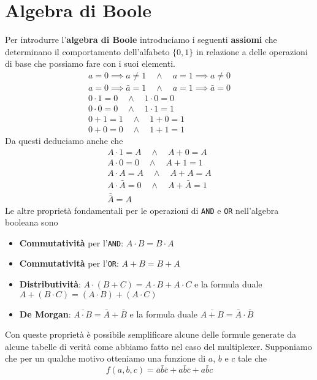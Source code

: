 \section{Algebra di Boole}
Per introdurre l'\textbf{algebra di Boole} introduciamo i seguenti \textbf{assiomi} che determinano
il comportamento dell'alfabeto $\{0, 1\}$ in relazione a delle operazioni di base che possiamo
fare con i suoi elementi.
\begin{gather*}
	a = 0 \implies a \neq 1 \quad \land \quad a = 1 \implies a \neq 0 \\
	a = 0 \implies \bar{a} = 1 \quad \land \quad a = 1 \implies \bar{a} = 0 \\
	0 \cdot 1 = 0 \quad \land \quad 1 \cdot 0 = 0 \\
	0 \cdot 0 = 0 \quad \land \quad 1 \cdot 1 = 1 \\
	0 + 1 = 1 \quad \land \quad 1 + 0 = 1 \\
	0 + 0 = 0 \quad \land \quad 1 + 1 = 1
\end{gather*}
Da questi deduciamo anche che
\begin{gather*}
	A \cdot 1 = A \quad \land \quad A + 0 = A \\
	A \cdot 0 = 0 \quad \land \quad A + 1 = 1 \\
	A \cdot A = A \quad \land \quad A + A = A \\
	A \cdot \bar{A} = 0 \quad \land \quad A + \bar{A} = 1 \\
	\bar{\bar{A}} = A
\end{gather*}
Le altre proprietà fondamentali per le operazioni di \verb|AND| e \verb|OR| nell'algebra booleana
sono
\begin{itemize}
	\item \textbf{Commutatività} per l'\verb|AND|: $A \cdot B = B \cdot A$
	\item \textbf{Commutatività} per l'\verb|OR|: $A + B = B + A$
	\item \textbf{Distributività}: $A \cdot (B + C) = A \cdot B + A \cdot C$ e la formula duale
	      $A + (B \cdot C) = (A \cdot B) + (A \cdot C)$
	\item \textbf{De Morgan}: $\overline{A \cdot B} = \bar{A} + \bar{B}$ e la formula duale
	      $\overline{A + B} = \bar{A} \cdot \bar{B}$
\end{itemize}
Con queste proprietà è possibile semplificare alcune delle formule generate da alcune tabelle di
verità come abbiamo fatto nel caso del multiplexer. Supponiamo che per un qualche motivo otteniamo
una funzione di $a$, $b$ e $c$ tale che
\[ f(a,b,c) = \bar{a} \bar{b} \bar{c} + a \bar{b} \bar{c} + a \bar{b} c \]

